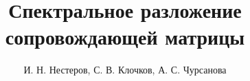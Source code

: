 \documentclass[10pt,a4paper,oneside]{article}
\begin{document}
 
\title{Спектральное разложение сопровождающей матрицы}
\author{И. Н. Нестеров, С. В. Клочков, А. С. Чурсанова}

\makemytitle



\cite{baskakov}


\end{document}
